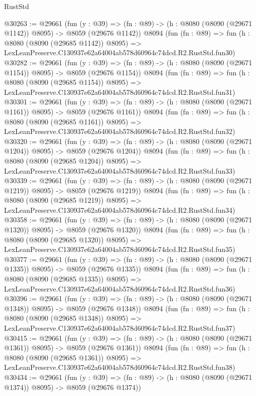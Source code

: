 \begin{lexlean}{RustStd}
\begin{coremodule}
@30263 := @29661
    (fun (y : @39) =>
    (fn : @89) -> (h : @8080 (@8090 (@29671 @1142)) @8095) -> @8059 (@29676 @1142))
    @8094
    (fun (fn : @89) =>
    fun (h : @8080 (@8090 (@29685 @1142)) @8095) =>
    LexLeanPreserve.C130937e62a64004ab578d60964c74dcd.R2.RustStd.fun30)
@30282 := @29661
    (fun (y : @39) =>
    (fn : @89) -> (h : @8080 (@8090 (@29671 @1154)) @8095) -> @8059 (@29676 @1154))
    @8094
    (fun (fn : @89) =>
    fun (h : @8080 (@8090 (@29685 @1154)) @8095) =>
    LexLeanPreserve.C130937e62a64004ab578d60964c74dcd.R2.RustStd.fun31)
@30301 := @29661
    (fun (y : @39) =>
    (fn : @89) -> (h : @8080 (@8090 (@29671 @1161)) @8095) -> @8059 (@29676 @1161))
    @8094
    (fun (fn : @89) =>
    fun (h : @8080 (@8090 (@29685 @1161)) @8095) =>
    LexLeanPreserve.C130937e62a64004ab578d60964c74dcd.R2.RustStd.fun32)
@30320 := @29661
    (fun (y : @39) =>
    (fn : @89) -> (h : @8080 (@8090 (@29671 @1204)) @8095) -> @8059 (@29676 @1204))
    @8094
    (fun (fn : @89) =>
    fun (h : @8080 (@8090 (@29685 @1204)) @8095) =>
    LexLeanPreserve.C130937e62a64004ab578d60964c74dcd.R2.RustStd.fun33)
@30339 := @29661
    (fun (y : @39) =>
    (fn : @89) -> (h : @8080 (@8090 (@29671 @1219)) @8095) -> @8059 (@29676 @1219))
    @8094
    (fun (fn : @89) =>
    fun (h : @8080 (@8090 (@29685 @1219)) @8095) =>
    LexLeanPreserve.C130937e62a64004ab578d60964c74dcd.R2.RustStd.fun34)
@30358 := @29661
    (fun (y : @39) =>
    (fn : @89) -> (h : @8080 (@8090 (@29671 @1320)) @8095) -> @8059 (@29676 @1320))
    @8094
    (fun (fn : @89) =>
    fun (h : @8080 (@8090 (@29685 @1320)) @8095) =>
    LexLeanPreserve.C130937e62a64004ab578d60964c74dcd.R2.RustStd.fun35)
@30377 := @29661
    (fun (y : @39) =>
    (fn : @89) -> (h : @8080 (@8090 (@29671 @1335)) @8095) -> @8059 (@29676 @1335))
    @8094
    (fun (fn : @89) =>
    fun (h : @8080 (@8090 (@29685 @1335)) @8095) =>
    LexLeanPreserve.C130937e62a64004ab578d60964c74dcd.R2.RustStd.fun36)
@30396 := @29661
    (fun (y : @39) =>
    (fn : @89) -> (h : @8080 (@8090 (@29671 @1348)) @8095) -> @8059 (@29676 @1348))
    @8094
    (fun (fn : @89) =>
    fun (h : @8080 (@8090 (@29685 @1348)) @8095) =>
    LexLeanPreserve.C130937e62a64004ab578d60964c74dcd.R2.RustStd.fun37)
@30415 := @29661
    (fun (y : @39) =>
    (fn : @89) -> (h : @8080 (@8090 (@29671 @1361)) @8095) -> @8059 (@29676 @1361))
    @8094
    (fun (fn : @89) =>
    fun (h : @8080 (@8090 (@29685 @1361)) @8095) =>
    LexLeanPreserve.C130937e62a64004ab578d60964c74dcd.R2.RustStd.fun38)
@30434 := @29661
    (fun (y : @39) =>
    (fn : @89) -> (h : @8080 (@8090 (@29671 @1374)) @8095) -> @8059 (@29676 @1374))

\end{coremodule}
\end{lexlean}
